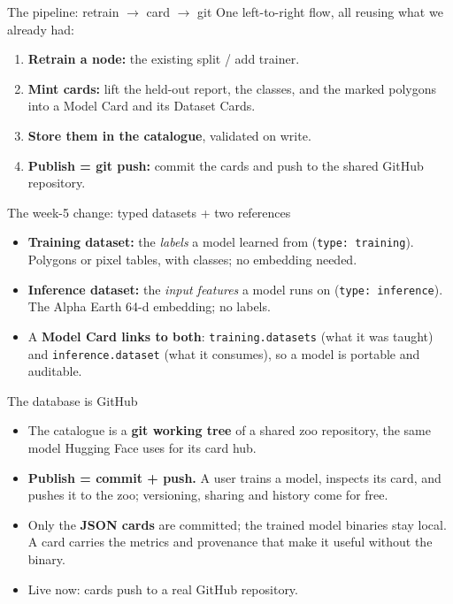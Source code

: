 \documentclass[aspectratio=169]{beamer}
\begin{document}
\begin{frame}{The pipeline: retrain $\rightarrow$ card $\rightarrow$ git}
One left-to-right flow, all reusing what we already had:
\begin{enumerate}
  \item \textbf{Retrain a node:} the existing split / add trainer.
  \item \textbf{Mint cards:} lift the held-out report, the classes, and the marked polygons into
  a Model Card and its Dataset Cards.
  \item \textbf{Store them in the catalogue}, validated on write.
  \item \textbf{Publish = git push:} commit the cards and push to the shared GitHub repository.
\end{enumerate}
\end{frame}

\begin{frame}{The week-5 change: typed datasets + two references}
\begin{itemize}
  \item \textbf{Training dataset:} the \emph{labels} a model learned from
  (\texttt{type:\,training}). Polygons or pixel tables, with classes; no embedding needed.
  \item \textbf{Inference dataset:} the \emph{input features} a model runs on
  (\texttt{type:\,inference}). The Alpha Earth 64-d embedding; no labels.
  \item A \textbf{Model Card links to both}: \texttt{training.datasets} (what it was taught) and
  \texttt{inference.dataset} (what it consumes), so a model is portable and auditable.
\end{itemize}
\end{frame}

\begin{frame}{The database is GitHub}
\begin{itemize}
  \item The catalogue is a \textbf{git working tree} of a shared zoo repository, the same model
  Hugging Face uses for its card hub.
  \item \textbf{Publish = commit + push.} A user trains a model, inspects its card, and pushes it to
  the zoo; versioning, sharing and history come for free.
  \item Only the \textbf{JSON cards} are committed; the trained model binaries stay local. A card
  carries the metrics and provenance that make it useful without the binary.
  \item Live now: cards push to a real GitHub repository.
\end{itemize}
\end{frame}
\end{document}
